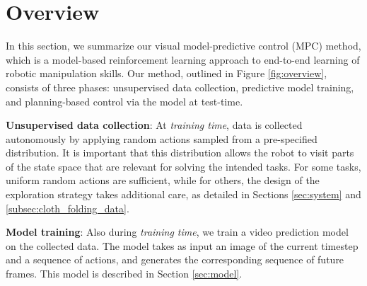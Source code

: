 \section{Overview}\label{sec:prelim}
\label{sec:vmpc}

In this section, we summarize our visual model-predictive control (MPC) method, which is a model-based reinforcement learning approach to end-to-end learning of robotic manipulation skills. Our method, outlined in Figure \ref{fig:overview}, consists of three phases: unsupervised data collection, predictive model training, and planning-based control via the model at test-time.

\noindent \textbf{Unsupervised data collection}: At \emph{training time}, data is collected autonomously by applying random actions sampled from a pre-specified distribution. It is important that this distribution allows the robot to visit parts of the state space that are relevant for solving the intended tasks. For some tasks, uniform random actions are sufficient, while for others, the design of the exploration strategy takes additional care, as detailed in Sections \ref{sec:system} and \ref{subsec:cloth_folding_data}.

\noindent \textbf{Model training}: Also during \emph{training time}, we train a video prediction model on the collected data. The model takes as input an image of the current timestep and a sequence of actions, and generates the corresponding sequence of future frames. This model is described in Section \ref{sec:model}.

